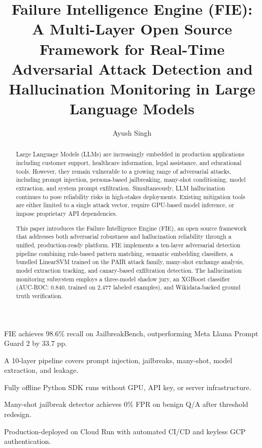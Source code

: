 \documentclass[preprint,12pt,authoryear]{elsarticle}
\begin{document}
\begin{frontmatter}

\title{Failure Intelligence Engine (FIE): A Multi-Layer Open Source
Framework for Real-Time Adversarial Attack Detection and Hallucination
Monitoring in Large Language Models}

\author[pcu]{Ayush Singh}

\address[pcu]{Department of Computer Science (Artificial Intelligence
and Data Science), Pimpri Chinchwad University, Pune 411044,
Maharashtra, India}

\begin{highlights}
\item FIE achieves 98.6\% recall on JailbreakBench, outperforming Meta Llama Prompt Guard 2 by 33.7 pp.
\item A 10-layer pipeline covers prompt injection, jailbreaks, many-shot, model extraction, and leakage.
\item Fully offline Python SDK runs without GPU, API key, or server infrastructure.
\item Many-shot jailbreak detector achieves 0\% FPR on benign Q/A after threshold redesign.
\item Production-deployed on Cloud Run with automated CI/CD and keyless GCP authentication.
\end{highlights}

\begin{abstract}
Large Language Models (LLMs) are increasingly embedded in production
applications including customer support, healthcare information, legal
assistance, and educational tools. However, they remain vulnerable to
a growing range of adversarial attacks, including prompt injection,
persona-based jailbreaking, many-shot conditioning, model extraction,
and system prompt exfiltration. Simultaneously, LLM hallucination
continues to pose reliability risks in high-stakes deployments. Existing
mitigation tools are either limited to a single attack vector, require
GPU-based model inference, or impose proprietary API dependencies.

This paper introduces the Failure Intelligence Engine (FIE), an open
source framework that addresses both adversarial robustness and
hallucination reliability through a unified, production-ready platform.
FIE implements a ten-layer adversarial detection pipeline combining
rule-based pattern matching, semantic embedding classifiers, a bundled
LinearSVM trained on the PAIR attack family, many-shot exchange
analysis, model extraction tracking, and canary-based exfiltration
detection. The hallucination monitoring subsystem employs a three-model
shadow jury, an XGBoost classifier (AUC-ROC: 0.840, trained on 2,477
labeled examples), and Wikidata-backed ground truth verification.


\end{abstract}
\end{frontmatter}
\end{document}
